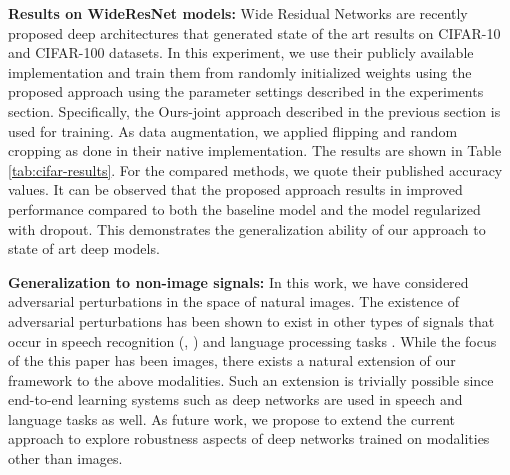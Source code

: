 \documentclass[letterpaper]{article} %
\begin{document}
\textbf{Results on WideResNet models:} Wide Residual Networks are recently proposed deep architectures that generated state of the art results on CIFAR-10 and CIFAR-100 datasets. In this experiment, we use their publicly available implementation and train them from randomly initialized weights using the proposed approach using the parameter settings described in the experiments section. Specifically, the Ours-joint approach described in the previous section is used for training. As data augmentation, we applied flipping and random cropping as done in their native implementation. The results are shown in Table \ref{tab:cifar-results}. For the compared methods, we quote their published accuracy values. It can be observed that the proposed approach results in improved performance compared to both the baseline model and the model regularized with dropout. This demonstrates the generalization ability of our approach to state of art deep models. 
\begin{center}
\label{tab:cifar-results}
\end{center}

\textbf{Generalization to non-image signals:}
In this work, we have considered adversarial perturbations in the space of natural images. The existence of adversarial perturbations has been shown to exist in other types of signals that occur in speech recognition (\cite{serdyuk2016invariant}, \cite{carlini_speech}) and language processing tasks \cite{miyato_NLP}. While the focus of the this paper has been images, there exists a natural extension of our framework to the above modalities. Such an extension is trivially possible since end-to-end learning systems such as deep networks are used in speech and language tasks as well. As future work, we propose to extend the current approach to explore robustness aspects of deep networks trained on modalities other than images.
\end{document}
